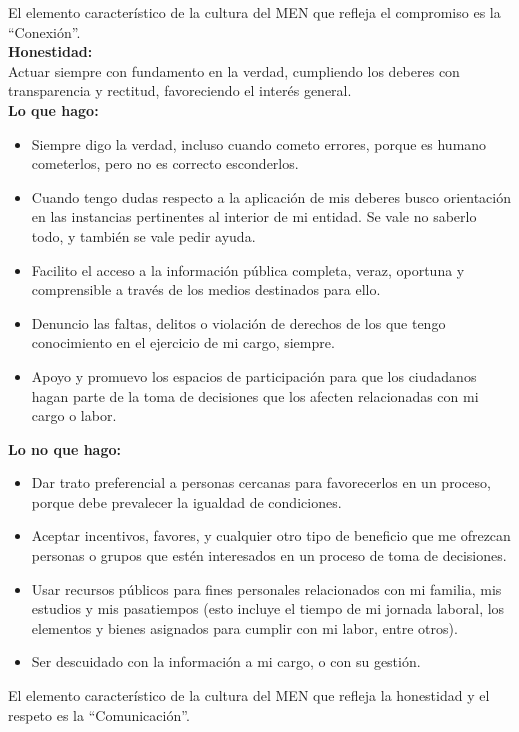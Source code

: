El elemento característico de la cultura del MEN que refleja el compromiso es la “Conexión”. \\

\textbf{Honestidad: } \\
Actuar siempre con fundamento en la verdad, cumpliendo los deberes con transparencia y rectitud, favoreciendo el interés general. \\

\textbf{Lo que hago: }
\begin{itemize}
	\item Siempre digo la verdad, incluso cuando cometo errores, porque es humano cometerlos, pero no es correcto esconderlos. 
	\item Cuando tengo dudas respecto a la aplicación de mis deberes busco orientación en las instancias pertinentes al interior de mi entidad. Se vale no saberlo todo, y también se vale pedir ayuda. 
	\item Facilito el acceso a la información pública completa, veraz, oportuna y comprensible a través de los medios destinados para ello.  
	\item Denuncio las faltas, delitos o violación de derechos de los que tengo conocimiento en el ejercicio de mi cargo, siempre. 
	\item Apoyo y promuevo los espacios de participación para que los ciudadanos hagan parte de la toma de decisiones que los afecten relacionadas con mi cargo o labor.  
\end{itemize}

\textbf{Lo no que hago: }
\begin{itemize}
	\item Dar trato preferencial a personas cercanas para favorecerlos en un proceso, porque debe prevalecer la igualdad de condiciones. 
	\item Aceptar incentivos, favores, y cualquier otro tipo de beneficio que me ofrezcan personas o grupos que estén interesados en un proceso de toma de decisiones. 
	\item Usar recursos públicos para fines personales relacionados con mi familia, mis estudios y mis pasatiempos (esto incluye el tiempo de mi jornada laboral, los elementos y bienes asignados para cumplir con mi labor, entre otros). 
	\item Ser descuidado con la información a mi cargo, o con su gestión. 
\end{itemize}

El elemento característico de la cultura del MEN que refleja la honestidad y el respeto es la “Comunicación”. \\


